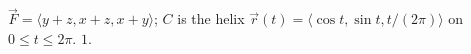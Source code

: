{$\vec F = \langle y+z,x+z,x+y\rangle$; $C$ is the helix $\vec r(t) = \langle \cos t,\sin t,t/(2\pi)\rangle$ on $0\leq t\leq 2\pi$.
}
{$1$. %
}
